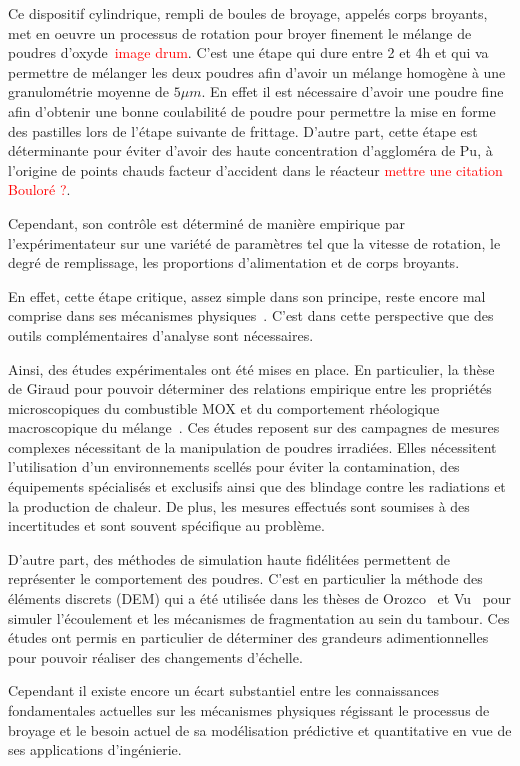Ce dispositif cylindrique, rempli de boules de broyage, appelés corps broyants, met en oeuvre un processus de rotation pour broyer finement le mélange de poudres d'oxyde~\textcolor{red}{image drum}. C'est une étape qui dure entre 2 et 4h et qui va permettre de mélanger les deux poudres afin d'avoir un mélange homogène à une granulométrie moyenne de $5\mu m$. En effet il est nécessaire d'avoir une poudre fine afin d'obtenir une bonne coulabilité de poudre pour permettre la mise en forme des pastilles lors de l'étape suivante de frittage. D'autre part, cette étape est déterminante pour éviter d'avoir des haute concentration d'aggloméra de Pu, à l'origine de points chauds facteur d'accident dans le réacteur \textcolor{red}{mettre une citation Bouloré ?}.


Cependant, son contrôle est déterminé de manière empirique par l'expérimentateur sur une variété de paramètres tel que la vitesse de rotation, le degré de remplissage, les proportions d'alimentation et de corps broyants.

En effet, cette étape critique, assez simple dans son principe, reste encore mal comprise dans ses mécanismes physiques~\cite{Austin1981,Brandao2020,Mankosa1986,Datta2002,Capece2014}. C'est dans cette perspective que des outils complémentaires d'analyse sont nécessaires.

Ainsi, des études expérimentales ont été mises en place. En particulier, la thèse de Giraud pour pouvoir déterminer des relations empirique entre les propriétés microscopiques du combustible MOX et du comportement rhéologique macroscopique du mélange~\cite{giraud_analyse_2020}. Ces études reposent sur des campagnes de mesures complexes nécessitant de la manipulation de poudres irradiées. Elles nécessitent l'utilisation d'un environnements scellés pour éviter la contamination, des équipements spécialisés et exclusifs ainsi que des blindage contre les radiations et la production de chaleur. De plus, les mesures effectués sont soumises à des incertitudes et sont souvent spécifique au problème.

D'autre part, des méthodes de simulation haute fidélitées permettent de représenter le comportement des poudres. C'est en particulier la méthode des éléments discrets (DEM) qui a été utilisée dans les thèses de Orozco~\cite{Orozco2019} et Vu~\cite{vu_quasi-static_2023} pour simuler l'écoulement et les mécanismes de fragmentation au sein du tambour. Ces études ont permis en particulier de déterminer des grandeurs adimentionnelles pour pouvoir réaliser des changements d'échelle.


Cependant il existe encore un écart substantiel entre les connaissances fondamentales actuelles sur les mécanismes physiques régissant le processus de broyage et le besoin actuel de sa modélisation prédictive et quantitative en vue de ses applications d'ingénierie.

